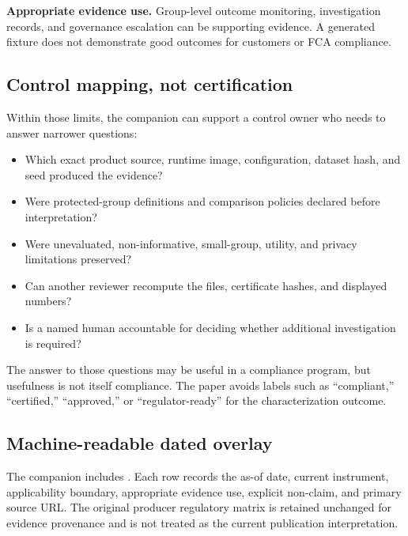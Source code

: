 \textbf{Appropriate evidence use.} Group-level outcome monitoring, investigation records, and
governance escalation can be supporting evidence. A generated fixture does not demonstrate good
outcomes for customers or FCA compliance.

\subsection{Control mapping, not certification}

Within those limits, the companion can support a control owner who needs to answer narrower
questions:

\begin{itemize}
  \item Which exact product source, runtime image, configuration, dataset hash, and seed produced
        the evidence?
  \item Were protected-group definitions and comparison policies declared before interpretation?
  \item Were unevaluated, non-informative, small-group, utility, and privacy limitations preserved?
  \item Can another reviewer recompute the files, certificate hashes, and displayed numbers?
  \item Is a named human accountable for deciding whether additional investigation is required?
\end{itemize}

The answer to those questions may be useful in a compliance program, but usefulness is not itself
compliance. The paper avoids labels such as ``compliant,'' ``certified,'' ``approved,'' or
``regulator-ready'' for the characterization outcome.

\subsection{Machine-readable dated overlay}

The companion includes
. Each row records the as-of
date, current instrument, applicability boundary, appropriate evidence use, explicit non-claim,
and primary source URL. The original producer regulatory matrix is retained unchanged for evidence
provenance and is not treated as the current publication interpretation.
